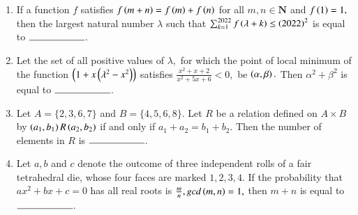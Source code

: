 \documentclass[journal,12pt,onecolumn]{IEEEtran}
\theoremstyle{remark}
\begin{document}
\begin{enumerate}
  \item If a function $f$ satisfies $f\left(m+n\right) = f\left(m\right) + f\left(n\right)$ for all $m,n \in \textbf{N}$ and $f\left(1\right) = 1,$ then the largest natural number $\lambda$ such that $\sum_{k=1}^{2022} f\left(\lambda + k\right) \le \left(2022\right) ^ 2$ is equal to $\rule{2cm}{0.15mm}$.\\

  \item Let the set of all positive values of $\lambda,$ for which the point of local minimum of the function $\left(1+x\left({\lambda} ^2 - x^2\right)\right)$ satisfies $\frac{x^2 + x+2}{x^2+5x+6} < 0,$ be $\left(\alpha, \beta\right).$ Then ${\alpha}^2 + {\beta}^2$ is equal to $\rule{2cm}{0.15mm}$.\\ 

  \item Let $A = \{2, 3, 6, 7\}$ and $B = \{4,5,6,8\}.$ Let $R$ be a relation defined on $A \times B$ by $\left(a_1,b_1\right) R \left(a_2,b_2\right)$ if and only if $a_1+a_2 = b_1 + b_2.$ Then the number of elements in $R$ is $\rule{2cm}{0.15mm}$.\\ 

  \item Let $a,b$ and $c$ denote the outcome of three independent rolls of a fair tetrahedral die, whose four faces are marked $1,2,3,4.$ If the probability that $ax^2 + bx +c=0$ has all real roots is $\frac{m}{n}, gcd\left(m,n\right)=1,$ then $m+n$ is equal to $\rule{2cm}{0.15mm}$.\\ 

  


 


 
 
 
\end{enumerate}
\end{document}

